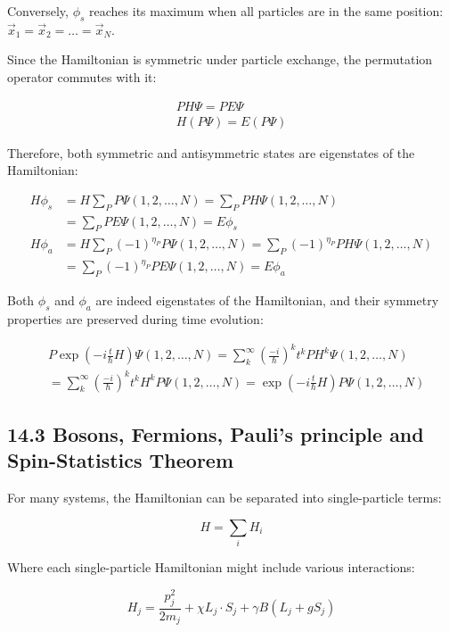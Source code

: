 \documentclass[italian]{HKNdocument}
\begin{document}
Conversely, $\phi_s$ reaches its maximum when all particles are in the same position: $\vec{x}_1=\vec{x}_2=\ldots=\vec{x}_N$.

Since the Hamiltonian is symmetric under particle exchange, the permutation operator commutes with it:

\begin{gather*}
PH\Psi=PE\Psi\\
H(P\Psi)=E(P\Psi) \tag{14.14}
\end{gather*}

Therefore, both symmetric and antisymmetric states are eigenstates of the Hamiltonian:

\begin{align*}
H\phi_s&=H\sum_P P\Psi(1,2,\ldots,N)=\sum_P PH\Psi(1,2,\ldots,N)\\
&=\sum_P PE\Psi(1,2,\ldots,N)=E\phi_s \tag{14.15}\\
H\phi_a&=H\sum_P(-1)^{\eta_P}P\Psi(1,2,\ldots,N)=\sum_P(-1)^{\eta_P}PH\Psi(1,2,\ldots,N)\\
&=\sum_P(-1)^{\eta_P}PE\Psi(1,2,\ldots,N)=E\phi_a \tag{14.16}
\end{align*}


Both $\phi_s$ and $\phi_a$ are indeed eigenstates of the Hamiltonian, and their symmetry properties are preserved during time evolution:

\begin{align*}
&P\exp(-i\frac{t}{\hbar}H)\Psi(1,2,\ldots,N)=\sum_{k}^{\infty}(\frac{-i}{\hbar})^k t^k PH^k\Psi(1,2,\ldots,N)\\
&=\sum_{k}^{\infty}(\frac{-i}{\hbar})^k t^k H^kP\Psi(1,2,\ldots,N)=\exp(-i\frac{t}{\hbar}H)P\Psi(1,2,\ldots,N) \tag{14.17}
\end{align*}

\subsection*{14.3 Bosons, Fermions, Pauli's principle and Spin-Statistics Theorem}
For many systems, the Hamiltonian can be separated into single-particle terms:

\begin{equation*}
H=\sum_i H_i \tag{14.18}
\end{equation*}

Where each single-particle Hamiltonian might include various interactions:

\begin{equation*}
H_j=\frac{p_j^2}{2m_j}+\chi L_j\cdot S_j+\gamma B(L_j+gS_j) \tag{14.19}
\end{equation*}
\end{document}
